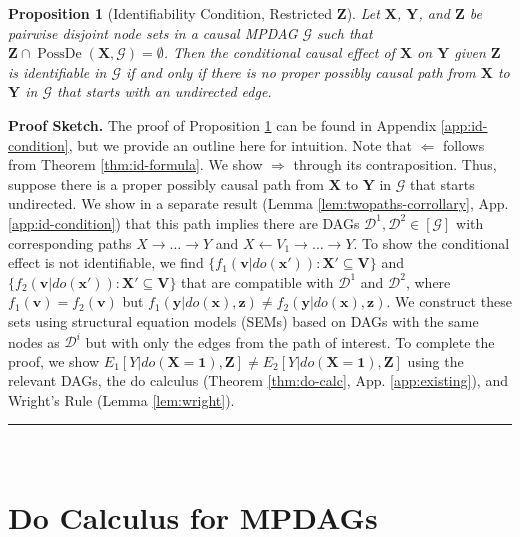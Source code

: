 \documentclass[11pt]{article}
\DeclareMathOperator{\PossDe}{PossDe}
\newcommand{\BlackBox}{\rule{1.5ex}{1.5ex}}  %
\newtheorem{proposition}[theorem]{Proposition}
\newcommand{\mb}[1]{\mathbf{#1}}
\newcommand{\g}[1][G]{\mathcal{#1}}
\newenvironment{proofsketch}{\noindent \textbf{Proof Sketch.}}{\hfill\BlackBox\\}
\begin{document}
\begin{proposition}[Identifiability Condition, Restricted $\mb{Z}$]
\label{prop:id-condition}
    Let $\mb{X}$, $\mb{Y}$, and $\mb{Z}$ be pairwise disjoint node sets in a causal MPDAG $\g$ such that $\mb{Z} \cap \PossDe(\mb{X},\g) = \emptyset$. Then the conditional causal effect of $\mb{X}$ on $\mb{Y}$ given $\mb{Z}$ is identifiable in $\g$ if and only if there is no proper possibly causal path from $\mb{X}$ to $\mb{Y}$ in $\g$ that starts with an undirected edge.
\end{proposition}

\begin{proofsketch}
    The proof of Proposition \ref{prop:id-condition} can be found in Appendix \ref{app:id-condition}, but we provide an outline here for intuition. Note that $\Leftarrow$ follows from Theorem \ref{thm:id-formula}. We show $\Rightarrow$ through its contraposition. Thus, suppose there is a proper possibly causal path from $\mb{X}$ to $\mb{Y}$ in $\g$ that starts undirected. We show in a separate result (Lemma \ref{lem:twopaths-corrollary}, App. \ref{app:id-condition}) that this path implies there are DAGs $\g[D]^1,\g[D]^2 \in [\g]$ with corresponding paths $X \to \dots \to Y$ and $X \gets V_1 \to \dots \to Y$. To show the conditional effect is not identifiable, we find $\{ f_1(\mb{v}|do(\mb{x'})) : \mb{X'} \subseteq \mb{V} \}$ and $\{ f_2(\mb{v}|do(\mb{x'})) : \mb{X'} \subseteq \mb{V} \}$ that are compatible with $\g[D]^1$ and $\g[D]^2$, where $f_1(\mb{v})=f_2(\mb{v})$ but $f_1(\mb{y} | do(\mb{x}), \mb{z}) \neq f_2(\mb{y} | do(\mb{x}), \mb{z})$. We construct these sets using structural equation models (SEMs) based on DAGs with the same nodes as $\g[D]^i$ but with only the edges from the path of interest. To complete the proof, we show $E_1[Y | do(\mb{X}=\mb{1}), \mb{Z}] \neq E_2[Y | do(\mb{X}=\mb{1}), \mb{Z}]$ using the relevant DAGs, the do calculus (Theorem \ref{thm:do-calc}, App. \ref{app:existing}), and Wright's Rule (Lemma \ref{lem:wright}).
\end{proofsketch}









  

\section{Do Calculus for MPDAGs}
\label{sec:do}
\end{document}
